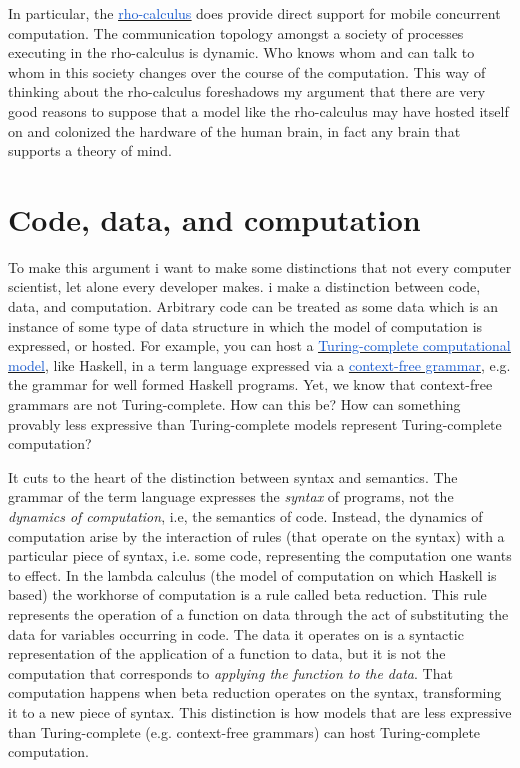 \documentclass[10pt]{report}
\begin{document}
\vspace{1\baselineskip}
In particular, the \href{https://www.sciencedirect.com/science/article/pii/S1571066105051893}{\uline{\textcolor[HTML]{1155CC}{rho-calculus}}} does provide direct support for mobile concurrent computation. The communication topology amongst a society of processes executing in the rho-calculus is dynamic. Who knows whom and can talk to whom in this society changes over the course of the computation. This way of thinking about the rho-calculus foreshadows my argument that there are very good reasons to suppose that a model like the rho-calculus may have hosted itself on and colonized the hardware of the human brain, in fact any brain that supports a theory of mind. 

\vspace{1\baselineskip}
\section{Code, data, and computation}

To make this argument i want to make some distinctions that not every computer scientist, let alone every developer makes. i make a distinction between code, data, and computation. Arbitrary code can be treated as some data which is an instance of some type of data structure in which the model of computation is expressed, or hosted. For example, you can host a \href{https://en.wikipedia.org/wiki/Turing_completeness}{\uline{\textcolor[HTML]{1155CC}{Turing-complete computational model}}}, like Haskell, in a term language expressed via a \href{https://en.wikipedia.org/wiki/Context-free_grammar}{\uline{\textcolor[HTML]{1155CC}{context-free grammar}}}, e.g. the grammar for well formed Haskell programs. Yet, we know that context-free grammars are not Turing-complete. How can this be? How can something provably less expressive than Turing-complete models represent Turing-complete computation?

\vspace{1\baselineskip}
It cuts to the heart of the distinction between syntax and semantics. The grammar of the term language expresses the \textit{syntax} of programs, not the \textit{dynamics of computation}, i.e, the semantics of code. Instead, the dynamics of computation arise by the interaction of rules (that operate on the syntax) with a particular piece of syntax, i.e. some code, representing the computation one wants to effect. In the lambda calculus (the model of computation on which Haskell is based) the workhorse of computation is a rule called beta reduction. This rule represents the operation of a function on data through the act of substituting the data for variables occurring in code. The data it operates on is a syntactic representation of the application of a function to data, but it is not the computation that corresponds to \textit{applying the function to the data}. That computation happens when beta reduction operates on the syntax, transforming it to a new piece of syntax. This distinction is how models that are less expressive than Turing-complete (e.g. context-free grammars) can host Turing-complete computation. 
\end{document}
